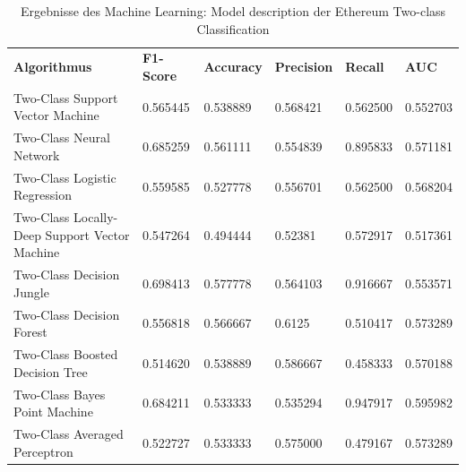 \begin{table}[H]
\centering
\begin{tabular}{|p{5cm}|p{}|p{}|p{}|p{}|p{}|}
\hline
\textbf{Algorithmus} & \textbf{F1-Score} & \textbf{Accuracy} & \textbf{Precision} & \textbf{Recall} & \textbf{AUC}\\ 
\hhline{======}
Two-Class Support Vector Machine & 0.565445 & 0.538889 & 0.568421 & 0.562500 & 0.552703 \\ \hline
Two-Class Neural Network & 0.685259 & 0.561111 & 0.554839 & 0.895833 & 0.571181 \\ \hline
Two-Class Logistic Regression & 0.559585 & 0.527778 & 0.556701 & 0.562500 & 0.568204 \\ \hline
Two-Class Locally-Deep Support Vector Machine & 0.547264 & 0.494444 & 0.52381 & 0.572917 & 0.517361 \\ \hline
Two-Class Decision Jungle & 0.698413 & 0.577778 & 0.564103 & 0.916667 & 0.553571 \\ \hline
Two-Class Decision Forest & 0.556818 & 0.566667 & 0.6125 & 0.510417 & 0.573289 \\ \hline
Two-Class Boosted Decision Tree & 0.514620 & 0.538889 & 0.586667 & 0.458333 & 0.570188 \\ \hline
Two-Class Bayes Point Machine & 0.684211 & 0.533333 & 0.535294 & 0.947917 & 0.595982 \\ \hline
Two-Class Averaged Perceptron & 0.522727 & 0.533333 & 0.575000 & 0.479167 & 0.573289 \\ \hline
\end{tabular}
\caption{Ergebnisse des Machine Learning: Model description der Ethereum Two-class Classification}
\end{table}


